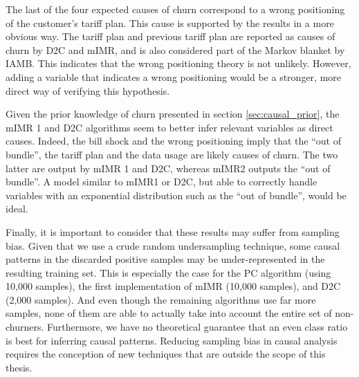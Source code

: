 The last of the four expected causes of churn correspond to a wrong positioning
of the customer's tariff plan. This cause is supported by the results in a more
obvious way. The tariff plan and previous tariff plan are reported as causes of
churn by D2C and mIMR, and is also considered part of the Markov blanket by
IAMB. This indicates that the wrong positioning theory is not unlikely. However,
adding a variable that indicates a wrong positioning would be a
stronger, more direct way of verifying this hypothesis.

Given the prior knowledge of churn presented in section \ref{sec:causal_prior},
the mIMR 1 and D2C algorithms seem to better infer relevant variables as direct
causes. Indeed, the bill shock and the wrong positioning imply that the ``out of
bundle'', the tariff plan and the data usage are likely causes of churn. The two
latter are output by mIMR 1 and D2C, whereas mIMR2 outputs the ``out of
bundle''. A model similar to mIMR1 or D2C, but able to correctly handle
variables with an exponential distribution such as the ``out of bundle'', would
be ideal.

Finally, it is important to consider that these results may suffer from sampling
bias. Given that we use a crude random undersampling technique, some causal
patterns in the discarded positive samples may be under-represented in the
resulting training set. This is especially the case for the PC algorithm (using
10,000 samples), the first implementation of mIMR (10,000 samples), and D2C
(2,000 samples). And even though the remaining algorithms use far more samples,
none of them are able to actually take into account the entire set of
non-churners. Furthermore, we have no theoretical guarantee that an even class
ratio is best for inferring causal patterns. Reducing sampling bias in causal
analysis requires the conception of new techniques that are outside the scope of
this thesis.
